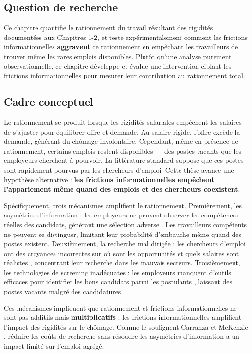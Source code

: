 \documentclass[12pt,a4paper]{article}
\begin{document}
\subsection{Question de recherche}

Ce chapitre quantifie le rationnement du travail résultant des rigidités documentées aux Chapitres 1-2, et teste expérimentalement comment les frictions informationnelles \textbf{aggravent} ce rationnement en empêchant les travailleurs de trouver même les rares emplois disponibles. Plutôt qu'une analyse purement observationnelle, ce chapitre développe et évalue une intervention ciblant les frictions informationnelles pour mesurer leur contribution au rationnement total.

\subsection{Cadre conceptuel}

Le rationnement se produit lorsque les rigidités salariales empêchent les salaires de s'ajuster pour équilibrer offre et demande. Au salaire rigide, l'offre excède la demande, générant du chômage involontaire. Cependant, même en présence de rationnement, certains emplois restent disponibles — des postes vacants que les employeurs cherchent à pourvoir. La littérature standard suppose que ces postes sont rapidement pourvus par les chercheurs d'emploi. Cette thèse avance une hypothèse alternative : \textbf{les frictions informationnelles empêchent l'appariement même quand des emplois et des chercheurs coexistent}.

Spécifiquement, trois mécanismes amplifient le rationnement. Premièrement, les asymétries d'information : les employeurs ne peuvent observer les compétences réelles des candidats, générant une sélection adverse \citep{carranza2022}. Les travailleurs compétents ne peuvent se distinguer, limitant leur probabilité d'embauche même quand des postes existent. Deuxièmement, la recherche mal dirigée : les chercheurs d'emploi ont des croyances incorrectes sur où sont les opportunités et quels salaires sont réalistes \citep{alfonsi2022, bandiera2023}, concentrant leur recherche dans les mauvais secteurs. Troisièmement, les technologies de screening inadéquates : les employeurs manquent d'outils efficaces pour identifier les bons candidats parmi les postulants \citep{hardy2023}, laissant des postes vacants malgré des candidatures.

Ces mécanismes impliquent que rationnement et frictions informationnelles ne sont pas additifs mais \textbf{multiplicatifs} : les frictions informationnelles amplifient l'impact des rigidités sur le chômage. Comme le soulignent Carranza et McKenzie \citeyearpar{carranza2024}, réduire les coûts de recherche sans résoudre les asymétries d'information a un impact limité sur l'emploi agrégé.
\end{document}
